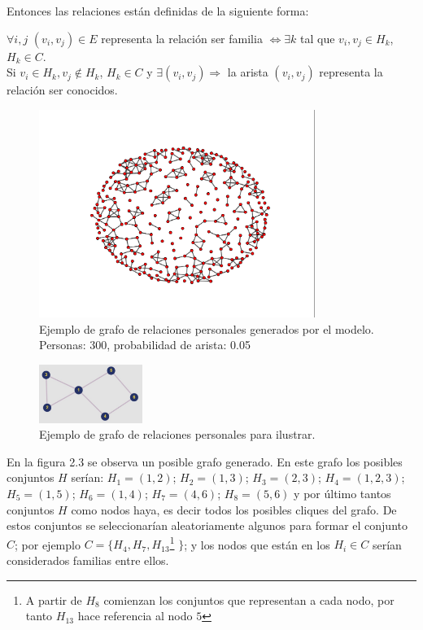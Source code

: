 Entonces las relaciones están definidas de la siguiente forma:
\begin{center}
    $\forall i,j$ $(v_{i}, v_{j}) \in E$ representa la relación ser familia  $\Leftrightarrow \exists k$ tal que $v_{i}, v_{j} \in H_{k}$, $H_{k} \in C$.\\
    Si $v_{i} \in H_{k}, v_{j} \notin H_{k}$, $H_{k} \in C$ y $\exists (v_{i}, v_{j}) \Rightarrow$ la arista $(v_{i}, v_{j})$  representa
    la relación ser conocidos.
\end{center}


\begin{figure}[htb]
    \centering
    \includegraphics[width=0.8\textwidth]{Graphics/Grafo_Pers.png}
    \caption{Ejemplo de grafo de relaciones personales generados por el modelo. Personas: 300, probabilidad de arista: 0.05}
\end{figure}

\begin{figure}
    \centering
    \includegraphics[width=0.3\textwidth]{Graphics/Grafo_Familias.jpeg}
    \caption{Ejemplo de grafo de relaciones personales para ilustrar.}
\end{figure}

En la figura 2.3 se observa un posible grafo generado. En este grafo los posibles conjuntos $H$ serían: 
$H_{1} = (1,2)$; $H_{2}=(1,3)$; $H_{3}=(2,3)$; $H_{4} = (1,2,3)$; $H_{5} = (1,5)$; $H_{6}=(1,4)$; $H_{7} = (4,6)$; $H_{8} = (5,6)$ y por último tantos conjuntos $H$ como nodos haya, es decir
todos los posibles cliques del grafo. De estos conjuntos se seleccionarían aleatoriamente algunos para formar el conjunto $C$;
por ejemplo $C = \lbrace H_{4}, H_{7}, H_{13}$\footnote{A partir de $H_{8}$ comienzan los conjuntos que representan a cada nodo, por tanto $H_{13}$ hace referencia al nodo $5$} $\rbrace$; y los nodos que están en los $H_{i} \in C$ serían considerados
familias entre ellos.

